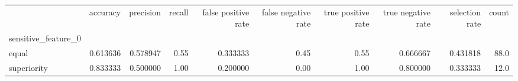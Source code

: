\begin{tabular}{lrrrrrrrrr}
\toprule
{} &  accuracy &  precision &  recall &  false positive rate &  false negative rate &  true positive rate &  true negative rate &  selection rate &  count \\
sensitive\_feature\_0 &           &            &         &                      &                      &                     &                     &                 &        \\
\midrule
equal               &  0.613636 &   0.578947 &    0.55 &             0.333333 &                 0.45 &                0.55 &            0.666667 &        0.431818 &   88.0 \\
superiority         &  0.833333 &   0.500000 &    1.00 &             0.200000 &                 0.00 &                1.00 &            0.800000 &        0.333333 &   12.0 \\
\bottomrule
\end{tabular}
